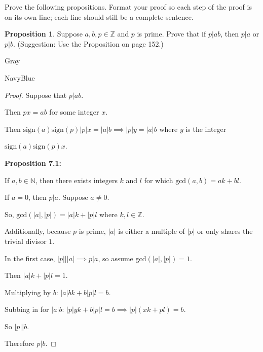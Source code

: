 \documentclass[12pt]{amsart}
\theoremstyle{named}
\newenvironment{prf}
{\medskip\begin{color}{Gray}\begin{framed}\begin{color}{NavyBlue}\begin{proof}[Proof]
\doublespacing}
{\end{proof}\end{color}\end{framed}\end{color}\medskip}
\theoremstyle{definition}
\newtheorem{proposition}{Proposition}
\newcommand{\Z}{\mathbb Z}
\begin{document}
Prove the following propositions. Format your proof so each step of the proof is on its own line; each line should still be a complete sentence.

\begin{proposition}
	Suppose $a,b,p\in\Z$ and $p$ is prime.
	Prove that if $p|ab$, then $p|a$ or $p|b$.
	(Suggestion: Use the Proposition on page 152.)
\end{proposition}

\begin{prf}
	\phantom{ }

	Suppose that $p|ab$. 
	
	Then $px = ab$ for some integer $x$.

	Then $\text{sign}(a) \text{sign}(p) |p|x = |a|b 
	\implies |p|y = |a|b$ where $y$ is the integer

	$\text{sign}(a)\text{sign}(p)x$.


	

	\textbf{Proposition 7.1:} 
	\begin{adjustwidth}{2em}{0em}
		If $a,b \in \mathbb N$, then
		there exists integers $k$ and $l$ for which $\text{gcd}(
		a,b) = ak + bl$.
	\end{adjustwidth} 

	If $a = 0$, then $p|a$. Suppose $a \neq 0$.

	So, $\text{gcd}(|a|,|p|) = |a|k + |p|l$ where $k,l \in \mathbb Z$.

	Additionally, because $p$ is prime, $|a|$ is either a
	multiple of $|p|$ or only shares the trivial divisor $1$.

	In the first case, $|p|||a| \implies p|a$, so assume $\text{gcd}(|a|,|p|) = 1$.

	Then $|a|k + |p|l = 1$.

	Multiplying by $b$: $|a|bk + b|p|l = b$.

	Subbing in for $|a|b$: $|p|yk + b|p|l = b \implies |p|(xk +pl) = b$.

	So $|p||b$.
	
	Therefore $p|b$. 
\end{prf}
\end{document}
